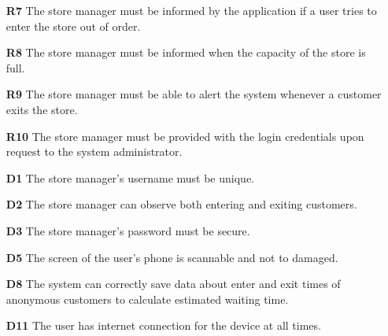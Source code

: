 \begin{enumerate}
\begin{enumerate}
		\item [\textbf{R7}] The store manager must be informed by the application if a user tries to enter the store out of order.
		\item [\textbf{R8}] The store manager must be informed when the capacity of the store is full.
		\item [\textbf{R9}] The store manager must be able to alert the system whenever a customer exits the store.
		\item [\textbf{R10}] The store manager must be provided with the login credentials upon request to the system administrator.
		\item [\textbf{D1}] The store manager's username must be unique. 
		\item [\textbf{D2}] The store manager can observe both entering and exiting customers.
		\item [\textbf{D3}] The store manager's password must be secure. 
		\item [\textbf{D5}] The screen of the user's phone is scannable and not to damaged.
		\item [\textbf{D8}] The system can correctly save data about enter and exit times of anonymous customers to calculate estimated waiting time.
		\item [\textbf{D11}] The user has internet connection for the device at all times.



\end{enumerate}
\end{enumerate}
